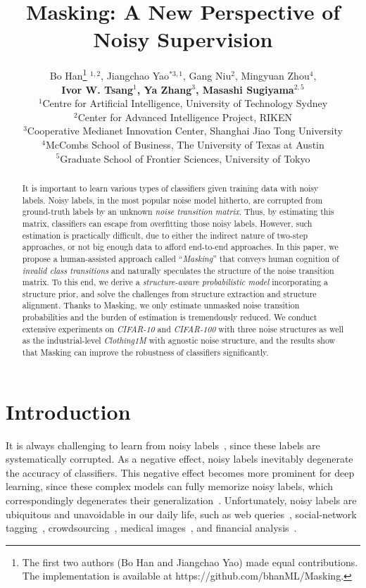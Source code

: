 \documentclass{article}
\title{Masking: A New Perspective of Noisy Supervision}
\author{
  Bo Han\thanks{The first two authors (Bo Han and Jiangchao Yao) made equal contributions. The implementation is available at https://github.com/bhanML/Masking.} $^{1,2}$, Jiangchao Yao$^{*3,1}$, Gang Niu$^2$, Mingyuan Zhou$^4$,\\
  \textbf{Ivor W. Tsang$^1$, Ya Zhang$^{3}$, Masashi Sugiyama$^{2,5}$}\\[1ex]
  $^1$Centre for Artificial Intelligence, University of Technology Sydney\\
  $^2$Center for Advanced Intelligence Project, RIKEN\\
  $^3$Cooperative Medianet Innovation Center, Shanghai Jiao Tong University\\
  $^4$McCombs School of Business, The University of Texas at Austin\\
  $^5$Graduate School of Frontier Sciences, University of Tokyo\\
}
\begin{document}
\maketitle

\begin{abstract}


It is important to learn various types of classifiers given training data with noisy labels. Noisy labels, in the most popular noise model hitherto, are corrupted from ground-truth labels by an unknown \textit{noise transition matrix}. Thus, by estimating this matrix, classifiers can escape from overfitting those noisy labels. However, such estimation is practically difficult, due to either the indirect nature of two-step approaches, or not big enough data to afford end-to-end approaches. In this paper, we propose a human-assisted approach called ``\textit{Masking}'' that conveys human cognition of \textit{invalid class transitions} and naturally speculates the structure of the noise transition matrix. To this end, we derive a \textit{structure-aware probabilistic model} incorporating a structure prior, and solve the challenges from structure extraction and structure alignment. Thanks to Masking, we only estimate unmasked noise transition probabilities and the burden of estimation is tremendously reduced. We conduct extensive experiments on \textit{CIFAR-10} and \textit{CIFAR-100} with three noise structures as well as the industrial-level \textit{Clothing1M} with agnostic noise structure, and the results show that Masking can improve the robustness of classifiers significantly.
\end{abstract}

\section{Introduction}
It is always challenging to learn from noisy labels~\cite{angluin1988learning,reed2014training,azadi2015auxiliary,rodrigues2017deep,ma2018dimensionality}, since these labels are systematically corrupted. As a negative effect, noisy labels inevitably degenerate the accuracy of classifiers. This negative effect becomes more prominent for deep learning, since these complex models can fully memorize noisy labels, which correspondingly degenerates their generalization~\cite{zhang2016understanding}. Unfortunately, noisy labels are ubiquitous and unavoidable in our daily life, such as web queries~\cite{liu2011noise}, social-network tagging~\cite{cha2012social}, crowdsourcing~\cite{welinder2010multidimensional}, medical images~\cite{dganitraining18training}, and financial analysis~\cite{ait2010high}.
\end{document}
